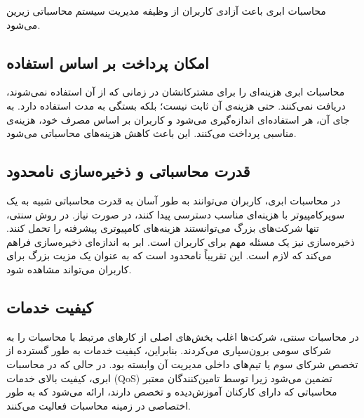 \documentclass{book}
\begin{document}
                \begin{addinfo}
                    
                    محاسبات ابری باعث آزادی کاربران از وظیفه مدیریت سیستم محاسباتی زیرین می‌شود.

                \end{addinfo}


    \subsection{امکان پرداخت بر اساس استفاده}

        محاسبات ابری هزینه‌ای را برای مشترکانشان در زمانی که از آن استفاده نمی‌شوند، دریافت نمی‌کنند. حتی هزینه‌ی آن ثابت نیست؛ بلکه بستگی به مدت استفاده دارد. به جای آن، هر استفاده‌ای اندازه‌گیری می‌شود و کاربران بر اساس مصرف خود، هزینه‌ی مناسبی پرداخت می‌کنند. این باعث کاهش هزینه‌های محاسباتی می‌شود.

    \subsection{قدرت محاسباتی و ذخیره‌سازی نامحدود}

        در محاسبات ابری، کاربران می‌توانند به طور آسان به قدرت محاسباتی شبیه به یک سوپرکامپیوتر با هزینه‌ای مناسب دسترسی پیدا کنند، در صورت نیاز. در روش سنتی، تنها شرکت‌های بزرگ می‌توانستند هزینه‌های کامپیوتری پیشرفته را تحمل کنند. ذخیره‌سازی نیز یک مسئله مهم برای کاربران است. ابر به اندازه‌ای ذخیره‌سازی فراهم می‌کند که لازم است. این تقریباً نامحدود است که به عنوان یک مزیت بزرگ برای کاربران می‌تواند مشاهده شود.

    \subsection{کیفیت خدمات}

        در محاسبات سنتی، شرکت‌ها اغلب بخش‌های اصلی از کارهای مرتبط با محاسبات را به شرکای سومی برون‌سپاری می‌کردند. بنابراین، کیفیت خدمات به طور گسترده از تخصص شرکای سوم یا تیم‌های داخلی مدیریت آن وابسته بود. در حالی که در محاسبات ابری، کیفیت بالای خدمات (QoS) تضمین می‌شود زیرا توسط تامین‌کنندگان معتبر محاسباتی که دارای کارکنان آموزش‌دیده و تخصص دارند، ارائه می‌شود که به طور اختصاصی در زمینه محاسبات فعالیت می‌کنند.
    
\end{document}

